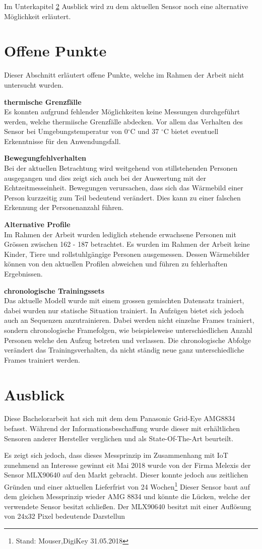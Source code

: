 Im Unterkapitel \ref{sec:Ausblick} Ausblick  wird zu dem aktuellen Sensor noch eine alternative Möglichkeit erläutert. 
\newpage

\section{Offene Punkte}
\label{sec:OffenePunkte}
Dieser Abschnitt erläutert offene Punkte, welche im Rahmen der Arbeit nicht untersucht wurden.

\textbf{thermische Grenzfälle}\\
Es konnten aufgrund fehlender Möglichkeiten keine Messungen durchgeführt werden, welche thermiische Grenzfälle abdecken. Vor allem das Verhalten des Sensor bei Umgebungstemperatur von 0$ ^\circ$C und 37 $^\circ$C bietet eventuell Erkenntnisse für den Anwendungsfall.

\textbf{Bewegungfehlverhalten}\\
Bei der aktuellen Betrachtung wird weitgehend von stillstehenden Personen ausgegangen und dies zeigt sich auch bei der Auswertung mit der Echtzeitmesseinheit. Bewegungen verursachen, dass sich das Wärmebild einer Person kurzzeitig zum Teil bedeutend verändert. Dies kann zu einer falschen Erkennung der Personenanzahl führen. 

\textbf{Alternative Profile}\\
Im Rahmen der Arbeit wurden lediglich stehende erwachsene Personen mit Grössen zwischen 162 - 187 betrachtet. Es wurden im Rahmen der Arbeit keine Kinder, Tiere und rollstuhlgängige Personen ausgemessen. Dessen Wärmebilder können von den aktuellen Profilen abweichen und führen zu fehlerhaften Ergebnissen.

\textbf{chronologische Trainingssets}\\
Das aktuelle Modell wurde mit einem grossen gemischten Datensatz trainiert, dabei wurden nur statische Situation trainiert. In Aufzügen bietet sich jedoch auch an Sequenzen anzutrainieren. Dabei werden nicht einzelne Frames trainiert, sondern chronologische Framefolgen, wie beispielsweise unterschiedlichen Anzahl Personen welche den Aufzug betreten und verlassen. Die chronologische Abfolge verändert das Trainingsverhalten, da nicht ständig neue ganz unterschiedliche Frames trainiert werden.

\newpage
\section{Ausblick}
\label{sec:Ausblick}
Diese Bachelorarbeit hat sich mit dem dem Panasonic Grid-Eye AMG8834 befasst. Während der Informationsbeschaffung wurde dieser mit erhältlichen Sensoren anderer Hersteller verglichen und als State-Of-The-Art beurteilt. 

Es zeigt sich jedoch, dass dieses Messprinzip im Zusammenhang mit \ac{IoT} zunehmend an Interesse gewinnt eit Mai 2018 wurde von der Firma Melexis der Sensor MLX90640 auf den Markt gebracht. Dieser konnte jedoch aus zeitlichen Gründen und einer aktuellen Lieferfrist von 24 Wochen\footnote{Stand: Mouser,DigiKey 31.05.2018 }
Dieser Sensor baut auf dem gleichen Messprinzip wieder AMG 8834 und könnte die Lücken, welche der verwendete Sensor besitzt schließen. Der MLX90640 besitzt mit einer Auflösung von 24x32 Pixel bedeutende Darstellun